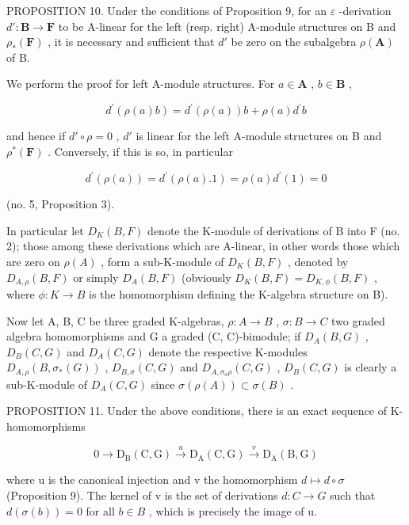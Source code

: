 PROPOSITION 10. Under the conditions of Proposition 9, for an \(\varepsilon\) -derivation \(d': \mathbf{B} \to \mathbf{F}\) to be A-linear for the left (resp. right) A-module structures on B and \(\rho_*(\mathbf{F})\) , it is necessary and sufficient that \(d'\) be zero on the subalgebra \(\rho(\mathbf{A})\) of B.

We perform the proof for left A-module structures. For \(a \in \mathbf{A}\) , \(b \in \mathbf{B}\) ,

\[
d ^ {\prime} (\rho (a) b) = d ^ {\prime} (\rho (a)) b + \rho (a) d ^ {\prime} b
\]

and hence if \(d' \circ \rho = 0\) , \(d'\) is linear for the left A-module structures on B and \(\rho^*(\mathbf{F})\) . Conversely, if this is so, in particular

\[
d ^ {\prime} (\rho (a)) = d ^ {\prime} (\rho (a). 1) = \rho (a) d ^ {\prime} (1) = 0
\]

(no. 5, Proposition 3).

In particular let \(D_{K}(B,F)\) denote the K-module of derivations of B into F (no. 2); those among these derivations which are A-linear, in other words those which are zero on \(\rho(A)\) , form a sub-K-module of \(D_{K}(B,F)\) , denoted by \(D_{A,\rho}(B,F)\) or simply \(D_{A}(B,F)\) (obviously \(D_{K}(B,F)=D_{K,\phi}(B,F)\) , where \(\phi:K\to B\) is the homomorphism defining the K-algebra structure on B).

Now let A, B, C be three graded K-algebras, \(\rho:A\to B\) , \(\sigma:B\to C\) two graded algebra homomorphisms and G a graded (C, C)-bimodule; if \(D_{A}(B,G)\) , \(D_{B}(C,G)\) and \(D_{A}(C,G)\) denote the respective K-modules \(D_{A,\rho}(B,\sigma_{*}(G))\) , \(D_{B,\sigma}(C,G)\) and \(D_{A,\sigma_{o}\rho}(C,G)\) , \(D_{B}(C,G)\) is clearly a sub-K-module of \(D_{A}(C,G)\) since \(\sigma(\rho(A))\subset\sigma(B)\) .

PROPOSITION 11. Under the above conditions, there is an exact sequence of K-homomorphisms

\[
0 \rightarrow \mathrm{D} _ {\mathrm{B}} (\mathrm{C}, \mathrm{G}) \xrightarrow {u} \mathrm{D} _ {\mathrm{A}} (\mathrm{C}, \mathrm{G}) \xrightarrow {v} \mathrm{D} _ {\mathrm{A}} (\mathrm{B}, \mathrm{G})\tag{27}
\]

where u is the canonical injection and v the homomorphism \(d \mapsto d \circ \sigma\) (Proposition 9). The kernel of v is the set of derivations \(d: C \to G\) such that \(d(\sigma(b)) = 0\) for all \(b \in B\) , which is precisely the image of u.

